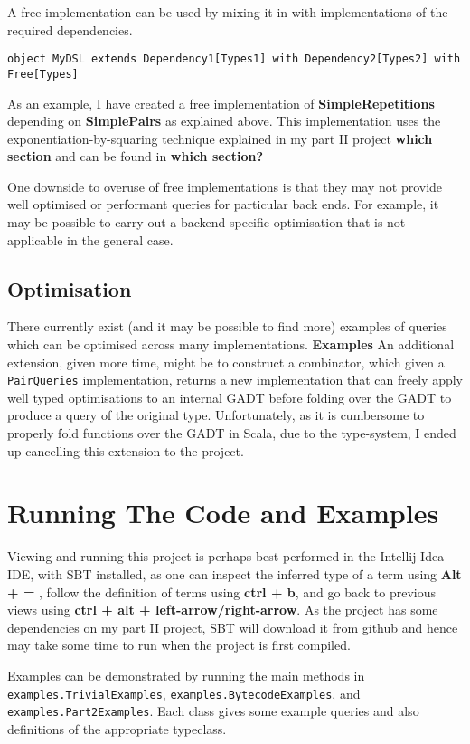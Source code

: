 \documentclass{report}
\newcommand \2[0]{\textbf{2}}
\newcommand \3[0]{\textbf{3}}
\newcommand{\todo}[1]{\textbf{#1}}
\begin{document}
A free implementation can be used by mixing it in with implementations of the required dependencies.

\begin{verbatim}
object MyDSL extends Dependency1[Types1] with Dependency2[Types2] with Free[Types]
\end{verbatim}

As an example, I have created a free implementation of \todo{SimpleRepetitions} depending on \todo{SimplePairs} as explained above. This  implementation uses the exponentiation-by-squaring technique explained in my part II project \todo{which section} and can be found in \todo{which section?}

One downside to overuse of free implementations is that they may not provide well optimised or performant queries for particular back ends. For example, it may be possible to carry out a backend-specific optimisation that is not applicable in the general case.

\section{Optimisation}
There currently exist (and it may be possible to find more) examples of queries which can be optimised across many implementations. \todo{Examples} An additional extension, given more time, might be to construct a combinator, which given a \texttt{PairQueries} implementation, returns a new implementation that can freely apply well typed optimisations to an internal GADT before folding over the GADT to produce a query of the original type. Unfortunately, as it is cumbersome to properly fold functions over the GADT in Scala, due to the type-system, I ended up cancelling this extension to the project.

\chapter{Running The Code and Examples}
Viewing and running this project is perhaps best performed in the Intellij Idea IDE, with SBT installed, as one can inspect the inferred type of a term using \todo{Alt + = }, follow the definition of terms using \todo{ctrl + b}, and go back to previous views using \todo{ctrl + alt + left-arrow/right-arrow}.
As the project has some dependencies on my part II project, SBT will download it from github and hence may take some time to run when the project is first compiled.

Examples can be demonstrated by running the main methods in \texttt{examples.TrivialExamples}, \texttt{examples.BytecodeExamples}, and \texttt{examples.Part2Examples}. Each class gives some example queries and also definitions of the appropriate typeclass.
\end{document}
